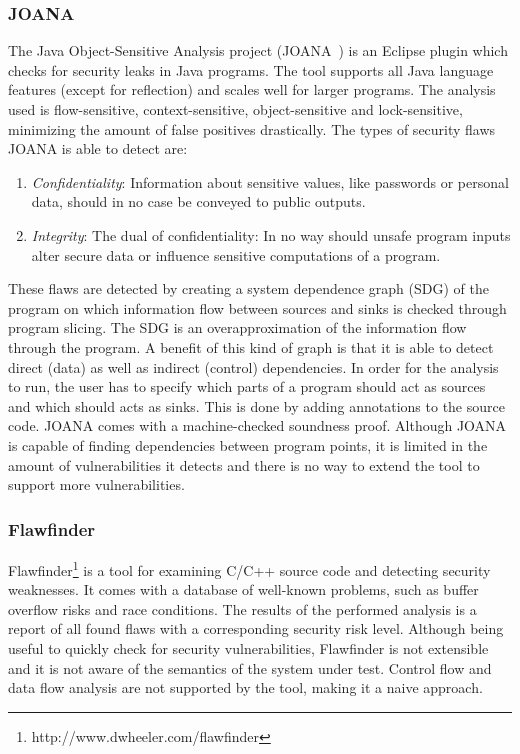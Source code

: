 \subsubsection*{JOANA}
The Java Object-Sensitive Analysis project (JOANA~\cite{JOANA}) is an Eclipse plugin which checks for security leaks in Java programs. The tool supports all Java language features (except for reflection) and scales well for larger programs. The analysis used is flow-sensitive, context-sensitive, object-sensitive and lock-sensitive, minimizing the amount of false positives drastically. The types of security flaws JOANA is able to detect are:
\begin{enumerate}
\item \textit{Confidentiality}: Information about sensitive values, like passwords or personal data, should in no case be conveyed to public outputs.
\item \textit{Integrity}: The dual of confidentiality: In no way should unsafe program inputs alter secure data or influence sensitive computations of a program.
\end{enumerate}
These flaws are detected by creating a system dependence graph (SDG) of the program on which information flow between sources and sinks is checked through program slicing. The SDG is an overapproximation of the information flow through the program. A benefit of this kind of graph is that it is able to detect direct (data) as well as indirect (control) dependencies. In order for the analysis to run, the user has to specify which parts of a program should act as sources and which should acts as sinks. This is done by adding annotations to the source code. JOANA comes with a machine-checked soundness proof. Although JOANA is capable of finding dependencies between program points, it is limited in the amount of vulnerabilities it detects and there is no way to extend the tool to support more vulnerabilities.

\subsubsection*{Flawfinder}
Flawfinder\footnote{http://www.dwheeler.com/flawfinder} is a tool for examining C/C++ source code and detecting security weaknesses. It comes with a database of well-known problems, such as buffer overflow risks and race conditions. The results of the performed analysis is a report of all found flaws with a corresponding security risk level. Although being useful to quickly check for security vulnerabilities, Flawfinder is not extensible and it is not aware of the semantics of the system under test. Control flow and data flow analysis are not supported by the tool, making it a naive approach.

